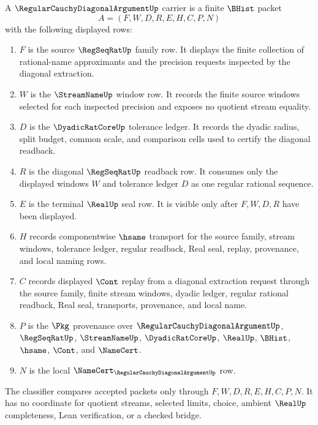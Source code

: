 \begin{definition}
\label{def:regular-cauchy-diagonal-argument-carrier}
A $\RegularCauchyDiagonalArgumentUp$ carrier is a finite $\BHist$ packet
$$
A=(F,W,D,R,E,H,C,P,N)
$$
with the following displayed rows:
\begin{enumerate}
\item $F$ is the source $\RegSeqRatUp$ family row. It displays the finite collection of rational-name approximants and the precision requests inspected by the diagonal extraction.
\item $W$ is the $\StreamNameUp$ window row. It records the finite source windows selected for each inspected precision and exposes no quotient stream equality.
\item $D$ is the $\DyadicRatCoreUp$ tolerance ledger. It records the dyadic radius, split budget, common scale, and comparison cells used to certify the diagonal readback.
\item $R$ is the diagonal $\RegSeqRatUp$ readback row. It consumes only the displayed windows $W$ and tolerance ledger $D$ as one regular rational sequence.
\item $E$ is the terminal $\RealUp$ seal row. It is visible only after $F,W,D,R$ have been displayed.
\item $H$ records componentwise $\hsame$ transport for the source family, stream windows, tolerance ledger, regular readback, Real seal, replay, provenance, and local naming rows.
\item $C$ records displayed $\Cont$ replay from a diagonal extraction request through the source family, finite stream windows, dyadic ledger, regular rational readback, Real seal, transports, provenance, and local name.
\item $P$ is the $\Pkg$ provenance over $\RegularCauchyDiagonalArgumentUp$, $\RegSeqRatUp$, $\StreamNameUp$, $\DyadicRatCoreUp$, $\RealUp$, $\BHist$, $\hsame$, $\Cont$, and $\NameCert$.
\item $N$ is the local $\NameCert_{\RegularCauchyDiagonalArgumentUp}$ row.
\end{enumerate}
The classifier compares accepted packets only through $F,W,D,R,E,H,C,P,N$. It has no coordinate for quotient streams, selected limits, choice, ambient $\RealUp$ completeness, Lean verification, or a checked bridge.
\end{definition}

